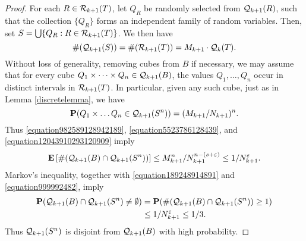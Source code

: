 \begin{proof}
    For each $R \in \operatorname{\mathcal{R}}_{k+1}(T)$, let $Q_R$ be randomly selected from $\operatorname{\mathcal{Q}}_{k+1}(R)$, such that the collection $\{ Q_R \}$ forms an independent family of random variables. Then, set $S = \bigcup \{ Q_R: R \in \operatorname{\mathcal{R}}_{k+1}(T) \}$. We then have
    \begin{equation} \label{equation6900921094190290}
        \#(\operatorname{\mathcal{Q}}_{k+1}(S)) = \#(\operatorname{\mathcal{R}}_{k+1}(T)) = M_{k+1} \cdot \operatorname{\mathcal{Q}}_k(T).
    \end{equation}
    Without loss of generality, removing cubes from $B$ if necessary, we may assume that for every cube $Q_1 \times \dots \times Q_n \in \operatorname{\mathcal{Q}}_{k+1}(B)$, the values $Q_1, \dots, Q_n$ occur in distinct intervals in $\operatorname{\mathcal{R}}_{k+1}(T)$. In particular, given any such cube, just as in Lemma \ref{discretelemma}, we have
    \begin{equation} \label{equation12043910293120909}
        \mathbf{P}(Q_1 \times \dots Q_n \in \operatorname{\mathcal{Q}}_{k+1}(S^n)) = (M_{k+1}/N_{k+1})^n.
    \end{equation}
    Thus \eqref{equation982589128942189}, \eqref{equation5523786128439}, and \eqref{equation12043910293120909} imply
    \begin{equation} \label{equation999992482}
        \mathbf{E} \left[ \#(\operatorname{\mathcal{Q}}_{k+1}(B) \cap \operatorname{\mathcal{Q}}_{k+1}(S^n)) \right] \leq M_{k+1}^n/N_{k+1}^{n - (s + \varepsilon)} \leq 1/N_{k+1}^\varepsilon.
    \end{equation}
    Markov's inequality, together with \eqref{equation189248914891} and \eqref{equation999992482}, imply
    \begin{equation} \label{fourierdim2}
    \begin{split}
        \mathbf{P}(\operatorname{\mathcal{Q}}_{k+1}(B) \cap \operatorname{\mathcal{Q}}_{k+1}(S^n) \neq \emptyset) &= \mathbf{P}(\# (\operatorname{\mathcal{Q}}_{k+1}(B) \cap \operatorname{\mathcal{Q}}_{k+1}(S^n)) \geq 1)\\
        &\leq 1/N_{k+1}^\varepsilon \leq 1/3.
    \end{split}
    \end{equation}
    Thus $\operatorname{\mathcal{Q}}_{k+1}(S^n)$ is disjoint from $\operatorname{\mathcal{Q}}_{k+1}(B)$ with high probability.


\end{proof}
